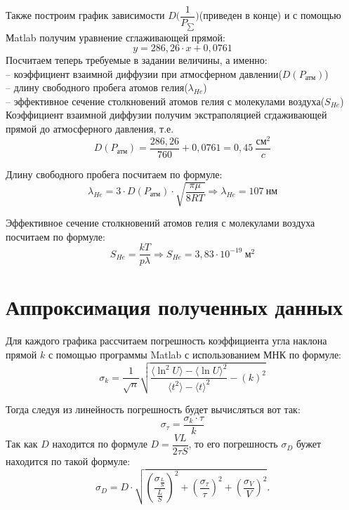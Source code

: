 Также построим график зависимости $D\bigg(\dfrac{1}{P_{\sum}}\bigg)$(приведен в конце) и с помощью Мatlab получим уравнение сглаживающей прямой:
\begin{equation}
	y = 286,26\cdot x + 0,0761
\end{equation}
Посчитаем теперь требуемые в задании величины, а именно:\\
	-- коэффициент взаимной диффузии при атмосферном давлении($D(P_{\text{атм}})$) \\
	-- длину свободного пробега атомов гелия($\lambda_{He}$)\\
	-- эффективное сечение столкновений атомов гелия с молекулами воздуха($S_{He}$)\\
	
Коэффициент взаимной диффузии получим экстраполяцией сгдаживающей прямой до атмосферного давления, т.е.
\begin{equation}
	D(P_{\text{атм}}) = \frac{286,26}{760} + 0,0761 = 0,45\ \frac{\text{см}^2}{c}
\end{equation}

Длину свободного пробега посчитаем по формуле:
\begin{equation}
	\lambda_{He} = 3\cdot D(P_{\text{атм}})\cdot \sqrt{\dfrac{\pi \mu}{8RT}} \Rightarrow  \lambda_{He} = 107\ \text{нм}
\end{equation}

Эффективное сечение столкновений атомов гелия с молекулами воздуха посчитаем по формуле:
\begin{equation}
	S_{He} = \frac{kT}{p\lambda} \Rightarrow S_{He} = 3,83 \cdot 10^{-19}\ \text{м}^2
\end{equation}


\section{Аппроксимация полученных данных}

Для каждого графика рассчитаем погрешность коэффициента угла наклона прямой $k$ с помощью программы  Matlab с использованием МНК по формуле:
\begin{equation}
	\sigma_k = \dfrac{1}{\sqrt{n}} \sqrt{\dfrac{\langle\ln^2 U\rangle - \langle\ln U\rangle^2}{\langle t^2\rangle - \langle t\rangle^2} - \left(k\right)^2}  
\end{equation}

Тогда следуя из линейность погрешность будет вычисляться вот так:
\begin{equation}
	\sigma_\tau = \dfrac{\sigma_k\cdot \tau}{k}
\end{equation}
Так как $D$ находится по формуле $D = \dfrac{VL}{2 \tau S}$, то его погрешность $\sigma_D$ бужет находится по такой формуле:
\begin{equation}
	\sigma_D = D \cdot \sqrt{\left(\dfrac{\sigma_{\frac{L}{S}}}{\frac{L}{S}}\right)^2 + \left(\dfrac{\sigma_{\tau}}{\tau}\right)^2 + \left(\dfrac{\sigma_V}{V}\right)^2}.
\end{equation}

